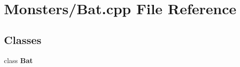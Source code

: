 \section{Monsters/\-Bat.cpp File Reference}
\label{_bat_8cpp}
\subsection*{Classes}
\begin{DoxyCompactItemize}
\item 
class {\bf Bat}
\end{DoxyCompactItemize}
